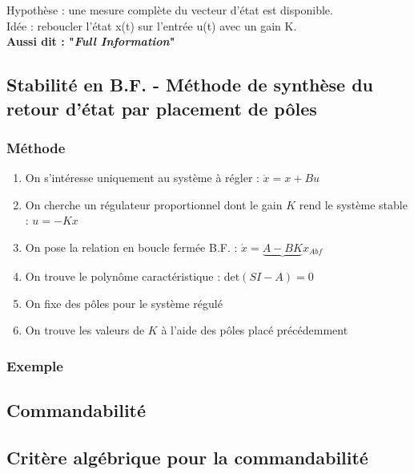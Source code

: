 \documentclass[document.tex]{subfiles}
\begin{document}
Hypothèse : une mesure complète du vecteur d'état est disponible.\\
Idée : reboucler l'état x(t) sur l'entrée u(t) avec un gain K.\\

\textbf{Aussi dit : "\textit{Full Information}"}

\subsection{Stabilité en B.F. - Méthode de synthèse du retour d'état par placement de pôles}


\subsubsection{Méthode}
\begin{enumerate}
	\item On s'intéresse uniquement au système à régler : $\boxed{\dot{x}= x + Bu}$
	\item On cherche un régulateur proportionnel dont le gain $K$ rend le système stable : $\boxed{u=-Kx}$
	\item On pose la relation en boucle fermée B.F. : $\boxed{\dot{x}=\underbrace{A-BK}x_{Abf}}$
	\item On trouve le polynôme caractéristique : $\boxed{\text{det}(SI-A) = 0}$
	\item On fixe des pôles pour le système régulé
	\item On trouve les valeurs de $K$ à l'aide des pôles placé précédemment
\end{enumerate}

\subsubsection{Exemple}




\subsection{Commandabilité}


\subsection{Critère algébrique pour la commandabilité}
\end{document}
